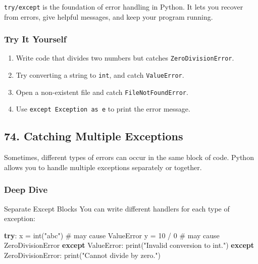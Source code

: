 \documentclass[
  letterpaper,
  DIV=11,
  numbers=noendperiod]{scrreprt}
\newenvironment{Shaded}{\begin{snugshade}}{\end{snugshade}}
\newcommand{\BuiltInTok}[1]{\textcolor[rgb]{0.00,0.23,0.31}{#1}}
\newcommand{\CommentTok}[1]{\textcolor[rgb]{0.37,0.37,0.37}{#1}}
\newcommand{\ControlFlowTok}[1]{\textcolor[rgb]{0.00,0.23,0.31}{\textbf{#1}}}
\newcommand{\DecValTok}[1]{\textcolor[rgb]{0.68,0.00,0.00}{#1}}
\newcommand{\NormalTok}[1]{\textcolor[rgb]{0.00,0.23,0.31}{#1}}
\newcommand{\OperatorTok}[1]{\textcolor[rgb]{0.37,0.37,0.37}{#1}}
\newcommand{\PreprocessorTok}[1]{\textcolor[rgb]{0.68,0.00,0.00}{#1}}
\newcommand{\StringTok}[1]{\textcolor[rgb]{0.13,0.47,0.30}{#1}}
\providecommand{\tightlist}{%
  \setlength{\itemsep}{0pt}\setlength{\parskip}{0pt}}
\begin{document}
\texttt{try/except} is the foundation of error handling in Python. It
lets you recover from errors, give helpful messages, and keep your
program running.

\subsubsection{Try It Yourself}\label{try-it-yourself-72}

\begin{enumerate}
\def\labelenumi{\arabic{enumi}.}
\tightlist
\item
  Write code that divides two numbers but catches
  \texttt{ZeroDivisionError}.
\item
  Try converting a string to \texttt{int}, and catch
  \texttt{ValueError}.
\item
  Open a non-existent file and catch \texttt{FileNotFoundError}.
\item
  Use \texttt{except\ Exception\ as\ e} to print the error message.
\end{enumerate}

\subsection{74. Catching Multiple
Exceptions}\label{catching-multiple-exceptions}

Sometimes, different types of errors can occur in the same block of
code. Python allows you to handle multiple exceptions separately or
together.

\subsubsection{Deep Dive}\label{deep-dive-73}

Separate Except Blocks You can write different handlers for each type of
exception:

\begin{Shaded}
\begin{Highlighting}[]
\ControlFlowTok{try}\NormalTok{:}
\NormalTok{    x }\OperatorTok{=} \BuiltInTok{int}\NormalTok{(}\StringTok{"abc"}\NormalTok{)    }\CommentTok{\# may cause ValueError}
\NormalTok{    y }\OperatorTok{=} \DecValTok{10} \OperatorTok{/} \DecValTok{0}        \CommentTok{\# may cause ZeroDivisionError}
\ControlFlowTok{except} \PreprocessorTok{ValueError}\NormalTok{:}
    \BuiltInTok{print}\NormalTok{(}\StringTok{"Invalid conversion to int."}\NormalTok{)}
\ControlFlowTok{except} \PreprocessorTok{ZeroDivisionError}\NormalTok{:}
    \BuiltInTok{print}\NormalTok{(}\StringTok{"Cannot divide by zero."}\NormalTok{)}
\end{Highlighting}
\end{Shaded}
\end{document}
